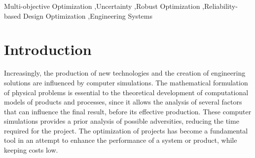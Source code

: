 \documentclass[final,5p,times,twocolumn,numbers]{elsarticle}
\begin{document}
\begin{frontmatter}


\begin{keyword}
Multi-objective Optimization \sep Uncertainty \sep Robust Optimization \sep Reliability-based Design Optimization \sep Engineering Systems
\end{keyword}

\end{frontmatter}


\section{Introduction} \label{sec:introduction}

Increasingly, the production of new technologies and the creation of engineering solutions are influenced by computer simulations. The mathematical formulation of physical problems is essential to the theoretical development of computational models of products and processes, since it allows the analysis of several factors that can influence the final result, before its effective production. These computer simulations provides a prior analysis of possible adversities, reducing the time required for the project. The optimization of projects has become a fundamental tool in an attempt to enhance the performance of a system or product, while keeping costs low.
\end{document}
